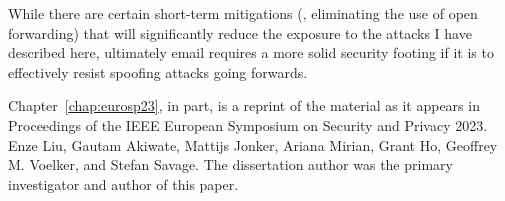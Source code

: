 While there are certain short-term mitigations (\eg, eliminating the use of
open forwarding) that will significantly reduce the exposure to the
attacks I have described here, ultimately email requires a more
solid security footing if it is to effectively resist spoofing
attacks going forwards.


Chapter~\ref{chap:eurosp23}, in part, is a reprint of the material as it appears in Proceedings of the IEEE European Symposium on Security and Privacy 2023. Enze Liu, Gautam Akiwate, Mattijs Jonker, Ariana Mirian, Grant Ho, Geoffrey M. Voelker, and Stefan Savage. The dissertation author was the primary investigator and author of this paper.






